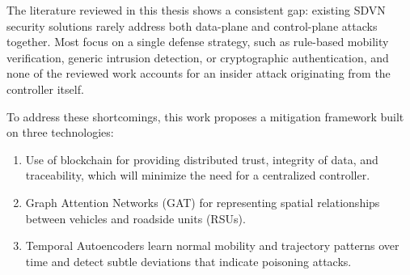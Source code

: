 \documentclass[12pt, a4paper]{report}
\begin{document}
The literature reviewed in this thesis shows a consistent gap: existing SDVN security solutions rarely address both data-plane and control-plane attacks together. Most focus on a single defense strategy, such as rule-based mobility verification, generic intrusion detection, or cryptographic authentication, and none of the reviewed work accounts for an insider attack originating from the controller itself.

To address these shortcomings, this work proposes a mitigation framework built on three technologies:
\begin{enumerate}
	\item Use of blockchain for providing distributed trust, integrity of data, and traceability, which will minimize the need for a centralized controller.
	\item Graph Attention Networks (GAT) for representing spatial relationships between vehicles and roadside units (RSUs).
	\item Temporal Autoencoders learn normal mobility and trajectory patterns over time and detect subtle deviations that indicate poisoning attacks.
\end{enumerate}
\end{document}
